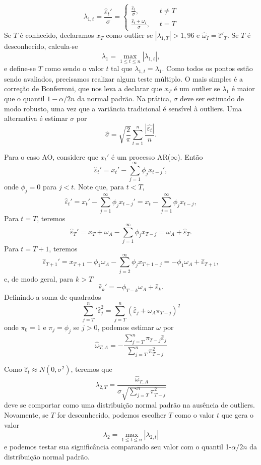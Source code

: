 \documentclass[
  letterpaper,
  DIV=11,
  numbers=noendperiod]{scrartcl}
\theoremstyle{definition}
\theoremstyle{definition}
\theoremstyle{plain}
\theoremstyle{plain}
\theoremstyle{remark}
\begin{document}
\[\lambda_{1,t}=\frac{\hat{\varepsilon}_t'}{\sigma}=\left\{\begin{array}{ll}\frac{\hat{\varepsilon}_t}{\sigma},&\;\; t\neq T\\ \frac{\hat{\varepsilon}_t+\omega_I}{\sigma},&\;\; t= T\end{array}\right.\]
Se \(T\) é conhecido, declaramos \(x_T\) como outlier se
\(|\lambda_{1,T}|>1,96\) e \(\hat{\omega}_I=\hat{\varepsilon}'_T\). Se
\(T\) é desconhecido, calcula-se
\[\lambda_1=\max_{1\leq t \leq n}|\lambda_{1,t}|,\] e define-se \(T\)
como sendo o valor \(t\) tal que \(\lambda_{1,t}=\lambda_1\). Como todos
os pontos estão sendo avaliados, precisamos realizar algum teste
múltiplo. O mais simples é a correção de Bonferroni, que nos leva a
declarar que \(x_T\) é um outlier se \(\lambda_1\) é maior que o quantil
\(1-\alpha/2n\) da normal padrão. Na prática, \(\sigma\) deve ser
estimado de modo robusto, uma vez que a variância tradicional é sensível
à outliers. Uma alternativa é estimar \(\sigma\) por
\[\hat{\sigma}=\sqrt{\frac{2}{\pi}}\sum_{t=1}^n\frac{|\hat{\varepsilon_t}|}{n}.\]

Para o caso AO, considere que \(x_t'\) é um processo AR(\(\infty\)).
Então \[\hat{\varepsilon}_t'=x_t'-\sum_{j=1}^\infty \phi_j x_{t-j}',\]
onde \(\phi_j=0\) para \(j<t\). Note que, para \(t<T\),
\[\hat{\varepsilon}_t'=x_t'-\sum_{j=1}^\infty \phi_j x_{t-j}'=x_t-\sum_{j=1}^\infty \phi_j x_{t-j},\]
Para \(t=T\), teremos
\[\hat{\varepsilon}_T'=x_T+\omega_A-\sum_{j=1}^\infty \phi_j x_{T-j}=\omega_A+\hat{\varepsilon}_T.\]
Para \(t=T+1\), teremos
\[\hat{\varepsilon}_{T+1}'=x_{T+1}-\phi_1\omega_A-\sum_{j=2}^\infty \phi_j x_{T+1-j}=-\phi_1\omega_A+\hat{\varepsilon}_{T+1},\]
e, de modo geral, para \(k>T\)
\[\hat{\varepsilon}_{k}'=-\phi_{T-k}\omega_A+\hat{\varepsilon}_k.\]
Definindo a soma de quadrados
\[\sum_{j=T}^n'\hat{\varepsilon}_j^2=\sum_{j=T}^{n}(\hat{\varepsilon}_{j}+\omega_A\pi_{T-j})^2\]
onde \(\pi_0=1\) e \(\pi_j=\phi_j\) se \(j>0\), podemos estimar
\(\omega\) por
\[\hat{\omega}_{T,A}=-\frac{\sum_{j=T}^n\pi_{T-j}\hat{\varepsilon}_{j}}{\sum_{j=T}^n\pi_{T-j}^2}\]

Como \(\hat{\varepsilon}_t\approx N(0,\sigma^2)\), teremos que
\[\lambda_{2,T}=\frac{\hat{\omega}_{T,A}}{\sigma\sqrt{\sum_{j=T}^n \pi_{T-j}^2}}\]
deve se comportar como uma distribuição normal padrão na ausência de
outliers. Novamente, se \(T\) for desconhecido, podemos escolher \(T\)
como o valor \(t\) que gera o valor
\[\lambda_2=\max_{1\leq t \leq n}|\lambda_{2,t}|\] e podemos testar sua
significância comparando seu valor com o quantil 1-\(\alpha/2n\) da
distribuição normal padrão.
\end{document}
